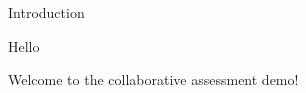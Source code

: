 
\begin{edXchapter}{Introduction}

%

\begin{edXtext}{Hello}

Welcome to the collaborative assessment demo!


\end{edXtext}
%
%

\end{edXchapter}

